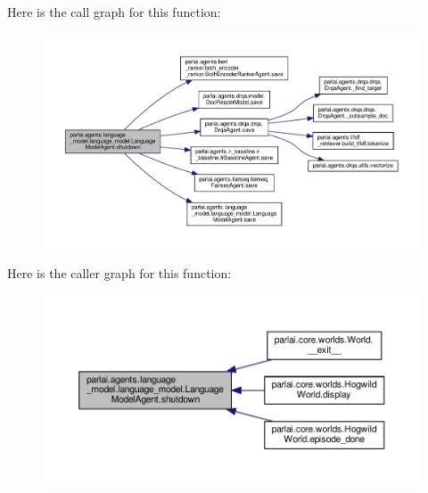 Here is the call graph for this function\+:
\nopagebreak
\begin{figure}[H]
\begin{center}
\leavevmode
\includegraphics[width=350pt]{classparlai_1_1agents_1_1language__model_1_1language__model_1_1LanguageModelAgent_ab7b37ff49b1ce04ef7ce0e598cf736e3_cgraph}
\end{center}
\end{figure}
Here is the caller graph for this function\+:
\nopagebreak
\begin{figure}[H]
\begin{center}
\leavevmode
\includegraphics[width=350pt]{classparlai_1_1agents_1_1language__model_1_1language__model_1_1LanguageModelAgent_ab7b37ff49b1ce04ef7ce0e598cf736e3_icgraph}
\end{center}
\end{figure}
\mbox{\label{classparlai_1_1agents_1_1language__model_1_1language__model_1_1LanguageModelAgent_af474c46339e2e0c881f8b8b81f5f9b7f}} 
